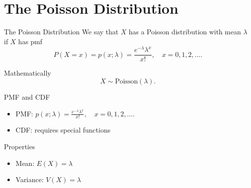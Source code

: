 \section{The Poisson Distribution}

\begin{frame}
  \begin{block}{The Poisson Distribution}
  We say that $X$ has a Poisson distribution with mean $\lambda$ if $X$ has pmf
  $$
  P(X=x)=p(x;\lambda)=\frac{e^{-\lambda} \lambda^x}{x!},\quad x=0,1,2,\ldots.
  $$
  
  \medskip
  
  Mathematically
      \[
        X \sim \mbox{Poisson}(\lambda).
      \]
  \end{block}
\end{frame}

\begin{frame}
  \begin{block}{PMF and CDF}
    \begin{itemize}
    \item PMF: $p(x;\lambda)=\frac{e^{-\lambda}\lambda^x}{x!},\quad x=0,1,2,\ldots$.
    \item CDF: requires special functions
    \end{itemize}
  \end{block}


  \begin{block}{Properties}
    \begin{itemize}
    \item Mean: $E(X)=\lambda$
      
    \item Variance: $V(X)=\lambda$
      
    \end{itemize}
  \end{block}
\end{frame}

